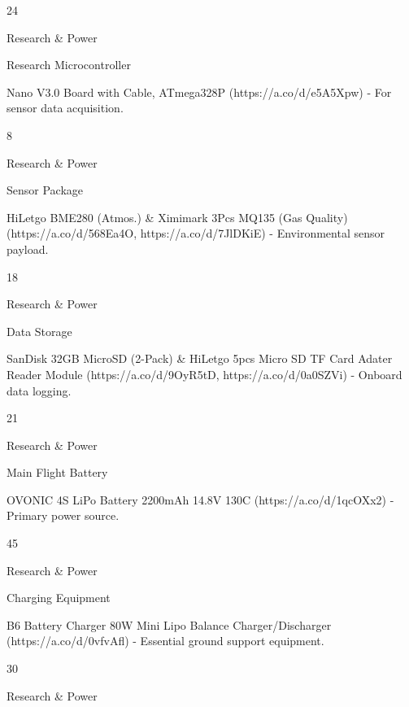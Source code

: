 \documentclass[11pt,letterpaper]{article}
\begin{document}
24\par

Research \& Power\par

Research Microcontroller\par

Nano V3.0 Board with Cable, ATmega328P (https://a.co/d/e5A5Xpw) - For sensor data acquisition.\par

8\par

Research \& Power\par

Sensor Package\par

HiLetgo BME280 (Atmos.) \& Ximimark 3Pcs MQ135 (Gas Quality) (https://a.co/d/568Ea4O, https://a.co/d/7JlDKiE) - Environmental sensor payload.\par

18\par

Research \& Power\par

Data Storage\par

SanDisk 32GB MicroSD (2-Pack) \& HiLetgo 5pcs Micro SD TF Card Adater Reader Module (https://a.co/d/9OyR5tD, https://a.co/d/0a0SZVi) - Onboard data logging.\par

21\par

Research \& Power\par

Main Flight Battery\par

OVONIC 4S LiPo Battery 2200mAh 14.8V 130C (https://a.co/d/1qcOXx2) - Primary power source.\par

45\par

Research \& Power\par

Charging Equipment\par

B6 Battery Charger 80W Mini Lipo Balance Charger/Discharger (https://a.co/d/0vfvAfl) - Essential ground support equipment.\par

30\par

Research \& Power\par
\end{document}
